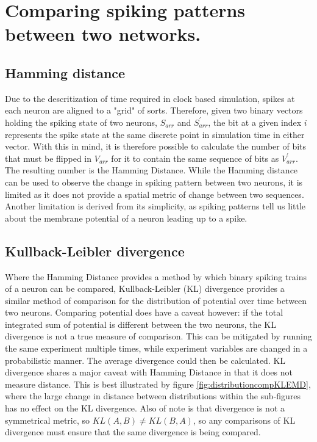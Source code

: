 

\section{Comparing spiking patterns between two networks.}
\label{Comparingspikingpatternsbetweentwonetworks}

\subsection{Hamming distance}
Due to the descritization of time required in clock based simulation, spikes at
each neuron are aligned to a "grid" of sorts. Therefore, given two binary
vectors holding the spiking state of two neurons, $S_{arr}$ and $S^\prime_{arr}$, the bit at a given index $i$ represents
the spike state at the same discrete point in simulation time in either vector.
With this in mind, it is therefore possible to calculate the number of bits
that must be flipped in $V_{arr}$ for it to contain the same sequence of bits as
$V^\prime_{arr}$. The resulting number is the Hamming Distance. While the
Hamming distance can be used to observe the change in spiking pattern between
two neurons, it is limited as it does not provide a spatial metric of change
between two sequences. Another limitation is derived from its simplicity, as
spiking patterns tell us little about the membrane potential of a neuron leading
up to a spike.

\subsection{Kullback-Leibler divergence}

Where the Hamming Distance provides a method by which binary spiking trains of a
neuron can be compared, Kullback-Leibler (KL) divergence provides a similar
method of comparison for the distribution of potential over time between two
neurons. Comparing potential does have a caveat however: if the total integrated
sum of potential is different between the two neurons, the KL divergence is not
a true measure of comparison. This can be mitigated by running the same
experiment multiple times, while experiment variables are changed in a
probabilistic manner. The average divergence could then be calculated. KL
divergence shares a major caveat with Hamming Distance in that it does not
measure distance. This is best illustrated by figure
\ref{fig:distributioncompKLEMD}, where the large change in distance between
distributions within the sub-figures has no effect on the KL divergence. Also of
note is that divergence is not a symmetrical metric, so $KL(A, B) \neq KL(B,
A)$, so any comparisons of KL divergence must ensure that the same divergence is
being compared.

